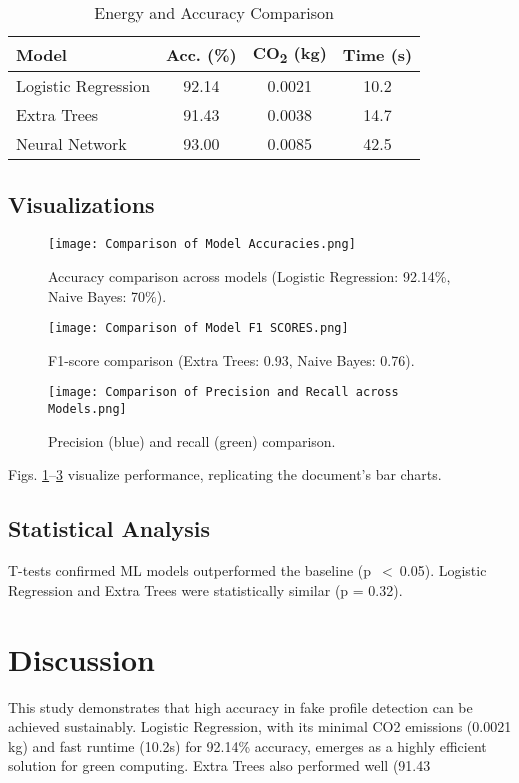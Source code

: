 \documentclass[conference]{IEEEtran}
\begin{document}
\begin{table}[htbp]
\small
\caption{Energy and Accuracy Comparison}
\begin{center}
\begin{tabular}{|l|c|c|c|}
\hline
\textbf{Model} & \textbf{Acc. (\%)} & \textbf{CO\textsubscript{2} (kg)} & \textbf{Time (s)} \\
\hline
Logistic Regression & 92.14 & 0.0021 & 10.2 \\
Extra Trees & 91.43 & 0.0038 & 14.7 \\
Neural Network \cite{b6} & 93.00 & 0.0085 & 42.5 \\
\hline
\end{tabular}
\label{tab:energy}
\end{center}
\end{table}

\subsection{Visualizations}
\begin{figure}[htbp]
\centerline{\texttt{[image: Comparison of Model Accuracies.png]}}
\caption{Accuracy comparison across models (Logistic Regression: 92.14\%, Naive Bayes: 70\%).}
\label{fig:acc}
\end{figure}

\begin{figure}[htbp]
\centerline{\texttt{[image: Comparison of Model F1 SCORES.png]}}
\caption{F1-score comparison (Extra Trees: 0.93, Naive Bayes: 0.76).}
\label{fig:f1}
\end{figure}

\begin{figure}[htbp]
\centerline{\texttt{[image: Comparison of Precision and Recall across Models.png]}}
\caption{Precision (blue) and recall (green) comparison.}
\label{fig:pr}
\end{figure}

Figs. \ref{fig:acc}--\ref{fig:pr} visualize performance, replicating the document’s bar charts.

\subsection{Statistical Analysis}
T-tests confirmed ML models outperformed the baseline (p~$<~$0.05). Logistic Regression and Extra Trees were statistically similar (p = 0.32).

\section{Discussion}
\label{sec:discuss}
This study demonstrates that high accuracy in fake profile detection can be achieved sustainably. Logistic Regression, with its minimal CO2 emissions (0.0021 kg) and fast runtime (10.2s) for 92.14\% accuracy, emerges as a highly efficient solution for green computing. Extra Trees also performed well (91.43%
\end{document}
